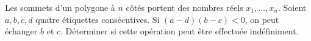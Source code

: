 Les sommets d'un polygone à $n$ côtés portent des nombres réels $x_1, \ldots, x_n$. Soient $a, b, c, d$ quatre étiquettes consécutives. Si $(a - d)(b - c) < 0$, on peut échanger $b$ et $c$. Déterminer si cette opération peut être effectuée indéfiniment.
